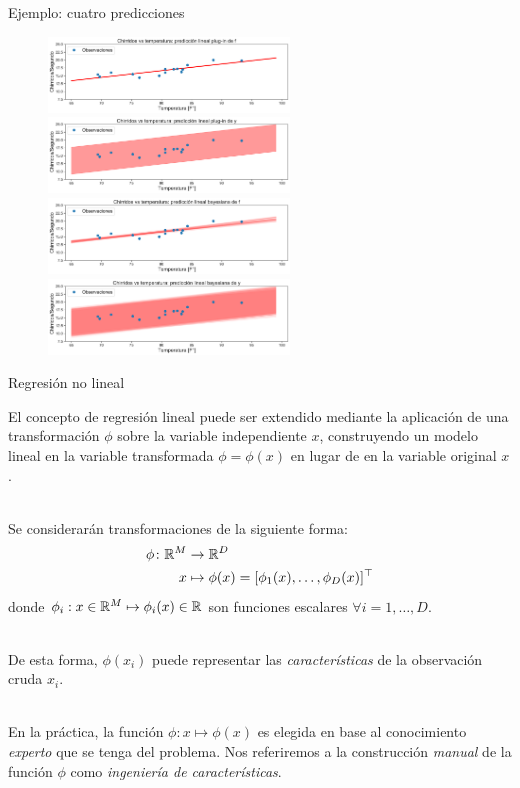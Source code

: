 \documentclass[9pt, handout]{beamer}
\begin{document}
\begin{frame}{Ejemplo: cuatro predicciones}

\begin{figure}[H]
	\centering
	\includegraphics[width=0.57\textwidth]{../img/cap2_chirridos_pred1}
	\includegraphics[width=0.57\textwidth]{../img/cap2_chirridos_pred2}
	\includegraphics[width=0.57\textwidth]{../img/cap2_chirridos_pred3}
	\includegraphics[width=0.57\textwidth]{../img/cap2_chirridos_pred4}
\end{figure}
	
\end{frame}

\begin{frame}{Regresión no lineal}

El concepto de regresión lineal puede ser extendido mediante la aplicación de una transformación $\phi$ sobre la variable independiente $x$, construyendo un modelo lineal en la variable transformada $\phi=\phi(x)$ en lugar de en la variable original $x$. \\~\ \pause

Se considerarán transformaciones de la siguiente forma:
\begin{align*}
  \phi \colon \mathbb{R}^M &\to \mathbb{R}^D\\
  x &\mapsto \phi(x)=[\phi_1(x),\ldots,\phi_D(x)]^\top
\end{align*}
donde $\phi_i: x\in\mathbb{R}^M \mapsto \phi_i(x)\in\mathbb{R}$ son funciones escalares $\forall i=1,\ldots,D$.\\~\ \pause

De esta forma, $\phi(x_i)$ puede representar las \emph{características} de la observación cruda $x_i$.\\~\ \pause

En la práctica, la función $\phi:x\mapsto\phi(x)$ es elegida en base  al conocimiento \emph{experto} que se tenga del problema. Nos referiremos a la construcción \emph{manual} de la función $\phi$ como \emph{ingeniería de características}.
	
\end{frame}
\end{document}
